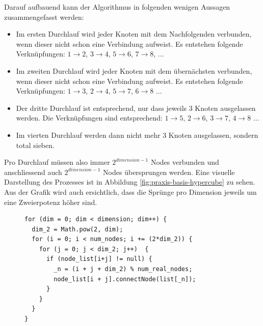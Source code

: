 Darauf aufbauend kann der Algorithmus in folgenden wenigen Aussagen zusammengefasst werden:
\begin{itemize}
 \item Im ersten Durchlauf wird jeder Knoten mit dem Nachfolgenden verbunden, wenn dieser nicht schon eine Verbindung aufweist. Es entstehen folgende Verkn\"upfungen: $1 \rightarrow 2$, $3 \rightarrow 4$, $5 \rightarrow 6$, $7 \rightarrow 8$, ...
 \item Im zweiten Durchlauf wird jeder Knoten mit dem \"ubern\"achsten verbunden, wenn dieser nicht schon eine Verbindung aufweist. Es entstehen folgende Verkn\"upfungen: $1 \rightarrow 3$, $2 \rightarrow 4$, $5 \rightarrow 7$, $6 \rightarrow 8$ ...
 \item Der dritte Durchlauf ist entsprechend, nur dass jeweils 3 Knoten ausgelassen werden. Die Verkn\"upfungen sind entsprechend: $1 \rightarrow 5$, $2 \rightarrow 6$, $3 \rightarrow 7$, $4 \rightarrow 8$ ...
 \item Im vierten Durchlauf werden dann nicht mehr 3 Knoten ausgelassen, sondern total sieben.
\end{itemize}
Pro Durchlauf m\"ussen also immer $2^{dimension-1}$ Nodes verbunden und anschliessend auch $2^{dimension-1}$ Nodes \"ubersprungen werden. Eine visuelle Darstellung des Prozesses ist in Abbildung \ref{fig:praxis-basis-hypercube} zu sehen. Aus der Grafik wird auch ersichtlich, dass die Spr\"unge pro Dimension jeweils um eine Zweierpotenz h\"oher sind.

\begin{figure}[h]
 \lstset{language=[ISO]C++}
 \begin{lstlisting}[label=alg:praxis-basis-hypercube-algemein,caption={[Algorithmus zur Erstellung eines Hypercubes]Algorithmus zur Erstellung eines Hypercubes\index{Hypercube} basierend auf einer Liste von Nodes. Die Pr\"ufung auf "`null"' bei der Verkn\"upfung behebt das Problem der leeren Knoten. Das Modulo mit der Anzahl existierender Knoten (Zeile 6) beim zu verbindenden Knoten gew\"ahrleistet, dass keine "`null"'-Node \"ubergeben wird und dass jede Node mehr als nur eine Verbindung aufweist.}]
for (dim = 0; dim < dimension; dim++) {
  dim_2 = Math.pow(2, dim);
  for (i = 0; i < num_nodes; i += (2*dim_2)) {
    for (j = 0; j < dim_2; j++)  {
      if (node_list[i+j] != null) {
        _n = (i + j + dim_2) % num_real_nodes;
        node_list[i + j].connectNode(list[_n]);
      }
    }
  }
}
 \end{lstlisting}
\end{figure}

